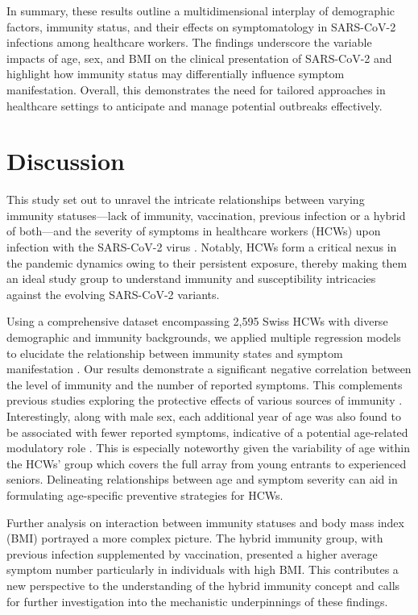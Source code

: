 \documentclass[11pt]{article}
\begin{document}
In summary, these results outline a multidimensional interplay of demographic factors, immunity status, and their effects on symptomatology in SARS-CoV-2 infections among healthcare workers. The findings underscore the variable impacts of age, sex, and BMI on the clinical presentation of SARS-CoV-2 and highlight how immunity status may differentially influence symptom manifestation. Overall, this demonstrates the need for tailored approaches in healthcare settings to anticipate and manage potential outbreaks effectively.

\section*{Discussion}

This study set out to unravel the intricate relationships between varying immunity statuses—lack of immunity, vaccination, previous infection or a hybrid of both—and the severity of symptoms in healthcare workers (HCWs) upon infection with the SARS-CoV-2 virus \cite{Hall2022ProtectionAS, Suryawanshi2022LimitedCI, Dagan2021BNT162b2MC, Gobbi2021AntibodyRT}. Notably, HCWs form a critical nexus in the pandemic dynamics owing to their persistent exposure, thereby making them an ideal study group to understand immunity and susceptibility intricacies against the evolving SARS-CoV-2 variants.

Using a comprehensive dataset encompassing 2,595 Swiss HCWs with diverse demographic and immunity backgrounds, we applied multiple regression models to elucidate the relationship between immunity states and symptom manifestation \cite{Nunes2022SARSCoV2OS, Vaishya2021SARSCoV2IA, Vishnoi2023SeverityAO}. Our results demonstrate a significant negative correlation between the level of immunity and the number of reported symptoms. This complements previous studies exploring the protective effects of various sources of immunity \cite{Hall2022ProtectionAS, Suryawanshi2022LimitedCI}. Interestingly, along with male sex, each additional year of age was also found to be associated with fewer reported symptoms, indicative of a potential age-related modulatory role \cite{Conti2020CoronavirusCA, Sattler2020SARSCoV2ST}. This is especially noteworthy given the variability of age within the HCWs' group which covers the full array from young entrants to experienced seniors. Delineating relationships between age and symptom severity can aid in formulating age-specific preventive strategies for HCWs.

Further analysis on interaction between immunity statuses and body mass index (BMI) portrayed a more complex picture. The hybrid immunity group, with previous infection supplemented by vaccination, presented a higher average symptom number particularly in individuals with high BMI. This contributes a new perspective to the understanding of the hybrid immunity concept and calls for further investigation into the mechanistic underpinnings of these findings.
\end{document}
